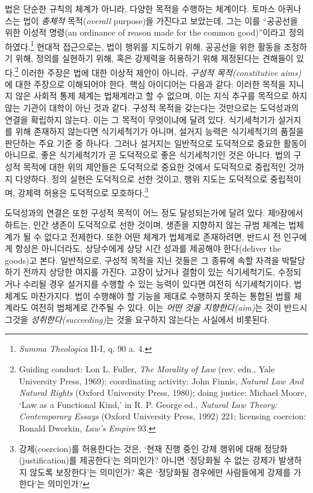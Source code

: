 \documentclass[12pt, oneside]{book}  %
\begin{document}
법은 단순한 규칙의 체계가 아니라, 다양한 목적을 수행하는 체계이다.
토마스 아퀴나스는 법이 \emph{총체적} 목적(\emph{overall} purpose)을
가진다고 보았는데, 그는 이를 ``공공선을 위한 이성적 명령(an ordinance of
reason made for the common good)''이라고 정의하였다.\footnote{\emph{Summa
  Theologica} II-I, q. 90 a. 4.} 현대적 접근으로는, 법이 행위를 지도하기
위해, 공공선을 위한 활동을 조정하기 위해, 정의를 실현하기 위해, 혹은
강제력을 허용하기 위해 제정된다는 견해들이 있다.\footnote{Guiding
  conduct: Lon L. Fuller, \emph{The Morality of Law} (rev. edn., Yale
  University Press, 1969); coordinating activity: John Finnis,
  \emph{Natural Law And Natural Rights} (Oxford University Press, 1980);
  doing justice: Michael Moore, `Law as a Functional Kind,' in R. P.
  George ed., \emph{Natural Law Theory: Contemporary Essays} (Oxford
  University Press, 1992) 221; licensing coercion: Ronald Dworkin,
  \emph{Law's Empire} 93.} 이러한 주장은 법에 대한 이상적 제안이 아니라,
\emph{구성적 목적(constitutive aims)}에 대한 주장으로 이해되어야 한다.
핵심 아이디어는 다음과 같다: 이러한 목적을 지니지 않은 사회적 통제
체계는 법체계라고 할 수 없으며, 이는 지식 추구를 목적으로 하지 않는
기관이 대학이 아닌 것과 같다. 구성적 목적을 갖는다는 것만으로는
도덕성과의 연결을 확립하지 않는다. 이는 그 목적이 무엇이냐에 달려 있다.
식기세척기가 설거지를 위해 존재하지 않는다면 식기세척기가 아니며, 설거지
능력은 식기세척기의 품질을 판단하는 주요 기준 중 하나다. 그러나 설거지는
일반적으로 도덕적으로 중요한 활동이 아니므로, 좋은 식기세척기가 곧
도덕적으로 좋은 식기세척기인 것은 아니다. 법의 구성적 목적에 대한 위의
제안들은 도덕적으로 중요한 것에서 도덕적으로 중립적인 것까지 다양하다.
정의 실현은 도덕적으로 선한 것이고, 행위 지도는 도덕적으로 중립적이며,
강제력 허용은 도덕적으로 모호하다.\footnote{강제(coercion)를 허용한다는
  것은, `현재 진행 중인 강제 행위에 대해 정당화(justification)를
  제공한다'는 의미인가? 아니면 `정당화될 수 없는 강제가 발생하지 않도록
  보장한다'는 의미인가? 혹은 `정당화될 경우에만 사람들에게 강제를
  가한다'는 의미인가?}

도덕성과의 연결은 또한 구성적 목적이 어느 정도 달성되는가에 달려 있다.
제9장에서 하트는, 인간 생존이 도덕적으로 선한 것이며, 생존을 지향하지
않는 규범 체계는 법체계가 될 수 없다고 전제한다. 또한 어떤 체계가
법체계로 존재하려면, 반드시 전 인구에게 항상은 아니더라도, 상당수에게
상당 시간 성과를 제공해야 한다(deliver the goods)고 본다. 일반적으로,
구성적 목적을 지닌 것들은 그 종류에 속할 자격을 박탈당하기 전까지 상당한
여지를 가진다. 고장이 났거나 결함이 있는 식기세척기도, 수정되거나 수리될
경우 설거지를 수행할 수 있는 능력이 있다면 여전히 식기세척기이다.
법체계도 마찬가지다. 법이 수행해야 할 기능을 제대로 수행하지 못하는
통합된 법률 체계라도 여전히 법체계로 간주될 수 있다. 이는 \emph{어떤
것을 지향한다(aim)}는 것이 반드시 그것을 \emph{성취한다(succeeding)}는
것을 요구하지 않는다는 사실에서 비롯된다.
\end{document}
